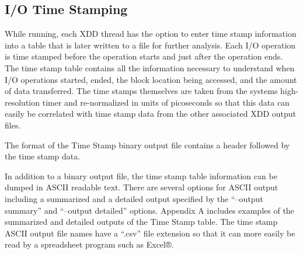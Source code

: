 \subsection{I/O Time Stamping}\label{io-time-stamping}

While running, each XDD thread has the option to enter time stamp information into a table that is later written to a file for further analysis. Each I/O operation is time stamped before the operation starts and just after the operation ends. The time stamp table contains all the information necessary to understand when I/O operations started, ended, the block location being accessed, and the amount of data transferred. The time stamps themselves are taken from the system\textquotesingle s high-resolution timer and re-normalized in units of picoseconds so that this data can easily be correlated with time stamp data from the other associated XDD output files.

The format of the Time Stamp binary output file contains a header followed by the time stamp data.

In addition to a binary output file, the time stamp table information can be dumped in ASCII readable text. There are several options for ASCII output including a summarized and a detailed output specified by the ``--output summary'' and ``--output detailed'' options. Appendix A includes examples of the summarized and detailed outputs of the Time Stamp table. The time stamp ASCII output file names have a ``.csv'' file extension so that it can more easily be read by a spreadsheet program such as Excel®.

